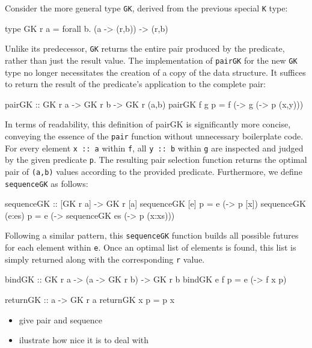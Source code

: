 \documentclass[runningheads]{llncs}
\begin{document}
Consider the more general type \texttt{GK}, derived from the previous
special \texttt{K} type:

\begin{code}
type GK r a = forall b. (a -> (r,b)) -> (r,b)
\end{code}

Unlike its predecessor, \texttt{GK} returns the entire pair produced by
the predicate, rather than just the result value. The implementation of
\texttt{pairGK} for the new \texttt{GK} type no longer necessitates the
creation of a copy of the data structure. It suffices to return the
result of the predicate's application to the complete pair:

\begin{code}
pairGK :: GK r a -> GK r b -> GK r (a,b)
pairGK f g p = f (\x -> g (\y -> p (x,y)))
\end{code}

In terms of readability, this definition of pairGK is significantly more
concise, conveying the essence of the \texttt{pair} function without
unnecessary boilerplate code. For every element \texttt{x\ ::\ a} within
\texttt{f}, all \texttt{y\ ::\ b} within \texttt{g} are inspected and
judged by the given predicate \texttt{p}. The resulting pair selection
function returns the optimal pair of \texttt{(a,b)} values according to
the provided predicate. Furthermore, we define \texttt{sequenceGK} as
follows:

\begin{code}
sequenceGK :: [GK r a] -> GK r [a]
sequenceGK [e] p    = e (\x -> p [x])
sequenceGK (e:es) p = e (\x -> sequenceGK es (\xs -> p (x:xs)))
\end{code}

Following a similar pattern, this \texttt{sequenceGK} function builds
all possible futures for each element within \texttt{e}. Once an optimal
list of elements is found, this list is simply returned along with the
corresponding \texttt{r} value.

\begin{code}
bindGK :: GK r a -> (a -> GK r b) -> GK r b
bindGK e f p = e (\x -> f x p)
\end{code}

\begin{code}
returnGK :: a -> GK r a
returnGK x p = p x
\end{code}

\begin{itemize}
\item
  give pair and sequence
\item
  ilustrate how nice it is to deal with
\end{itemize}
\end{document}
